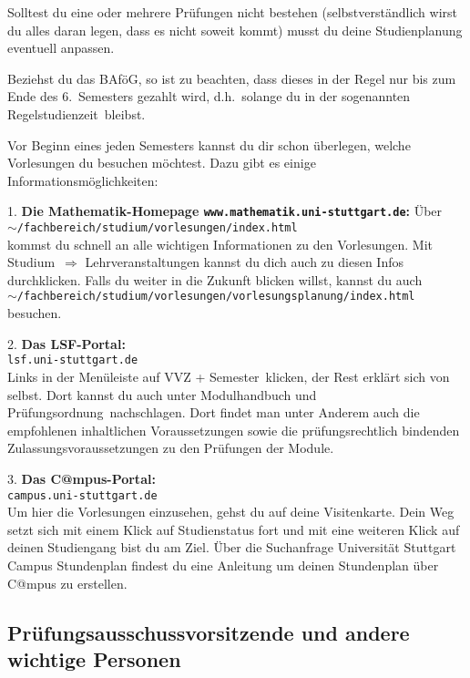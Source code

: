 Solltest du eine oder mehrere Prüfungen nicht bestehen
(selbstverständlich wirst du alles daran legen,
dass es nicht soweit kommt)
musst du deine Studienplanung eventuell anpassen.

Beziehst du das BAföG, so ist zu beachten,
dass dieses in der Regel nur bis zum Ende
des 6.~Semesters gezahlt wird,
d.h.\ solange du in der sogenannten
\glqq Regelstudienzeit\grqq\ bleibst.

Vor Beginn eines jeden Semesters kannst du dir schon überlegen,
welche Vorlesungen du besuchen möchtest.
Dazu gibt es einige Informationsmöglichkeiten:

1. {\bf Die Mathematik-Homepage {\verb|www.mathematik.uni-stuttgart.de|}:}
Über\\ 
$ \sim ${\verb|/fachbereich/studium/vorlesungen/index.html|}\\
kommst du schnell an alle wichtigen Informationen zu den Vorlesungen.
Mit \glqq Studium\grqq\ $\Rightarrow$ \glqq Lehrveranstaltungen\grqq 
kannst du dich auch zu diesen Infos durchklicken.
Falls du weiter in die Zukunft blicken willst, kannst du auch\\
$ \sim ${\verb|/fachbereich/studium/vorlesungen/vorlesungsplanung/index.html|}\\
besuchen.


2. {\bf Das LSF-Portal:}\\
{\verb|lsf.uni-stuttgart.de|}\\
Links in der Menüleiste auf \glqq VVZ + Semester\grqq\ klicken,
der Rest erklärt sich von selbst.
Dort kannst du auch unter \glqq Modulhandbuch
und Prüfungsordnung\grqq\ nachschlagen.
Dort findet man unter Anderem
auch die empfohlenen inhaltlichen Voraussetzungen
sowie die prüfungsrechtlich bindenden
Zulassungsvoraussetzungen zu den Prüfungen der Module.

3. {\bf Das C@mpus-Portal:}\\
{\verb|campus.uni-stuttgart.de|}\\
Um hier die Vorlesungen einzusehen, gehst du auf deine Visitenkarte.
Dein Weg setzt sich mit einem Klick auf Studienstatus fort und mit
eine weiteren Klick auf deinen Studiengang bist du am Ziel.
Über die Suchanfrage \glqq Universität Stuttgart Campus Stundenplan\grqq
findest du eine Anleitung um deinen Stundenplan über C@mpus zu erstellen.
\newpage
\subsection{Prüfungsausschussvorsitzende und andere wichtige Personen}

